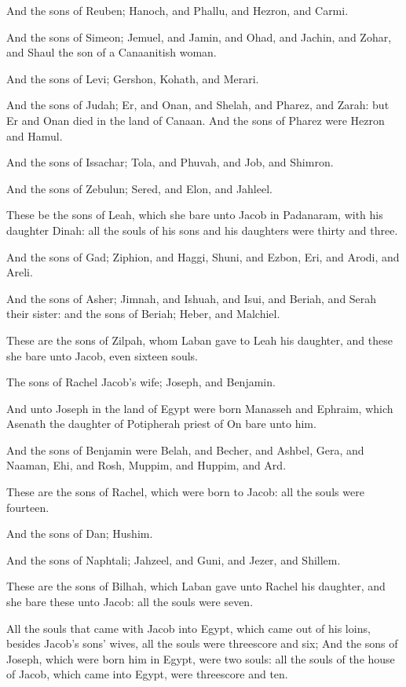 \verse And the sons of Reuben; Hanoch, and Phallu, and Hezron, and Carmi.

\verse And the sons of Simeon; Jemuel, and Jamin, and Ohad, and Jachin, and Zohar, and Shaul the son of a Canaanitish woman.

\verse And the sons of Levi; Gershon, Kohath, and Merari.

\verse And the sons of Judah; Er, and Onan, and Shelah, and Pharez, and Zarah: but Er and Onan died in the land of Canaan. And the sons of Pharez were Hezron and Hamul.

\verse And the sons of Issachar; Tola, and Phuvah, and Job, and Shimron.

\verse And the sons of Zebulun; Sered, and Elon, and Jahleel.

\verse These be the sons of Leah, which she bare unto Jacob in Padanaram, with his daughter Dinah: all the souls of his sons and his daughters were thirty and three.

\verse And the sons of Gad; Ziphion, and Haggi, Shuni, and Ezbon, Eri, and Arodi, and Areli.

\verse And the sons of Asher; Jimnah, and Ishuah, and Isui, and Beriah, and Serah their sister: and the sons of Beriah; Heber, and Malchiel.

\verse These are the sons of Zilpah, whom Laban gave to Leah his daughter, and these she bare unto Jacob, even sixteen souls.

\verse The sons of Rachel Jacob's wife; Joseph, and Benjamin.

\verse And unto Joseph in the land of Egypt were born Manasseh and Ephraim, which Asenath the daughter of Potipherah priest of On bare unto him.

\verse And the sons of Benjamin were Belah, and Becher, and Ashbel, Gera, and Naaman, Ehi, and Rosh, Muppim, and Huppim, and Ard.

\verse These are the sons of Rachel, which were born to Jacob: all the souls were fourteen.

\verse And the sons of Dan; Hushim.

\verse And the sons of Naphtali; Jahzeel, and Guni, and Jezer, and Shillem.

\verse These are the sons of Bilhah, which Laban gave unto Rachel his daughter, and she bare these unto Jacob: all the souls were seven.

\verse All the souls that came with Jacob into Egypt, which came out of his loins, besides Jacob's sons' wives, all the souls were threescore and six; \verse And the sons of Joseph, which were born him in Egypt, were two souls: all the souls of the house of Jacob, which came into Egypt, were threescore and ten.

